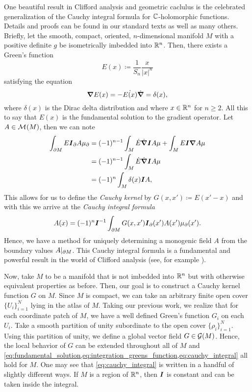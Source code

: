 One beautiful result in Clifford analysis and geometric caclulus is the celebrated generalization of the Cauchy integral formula for $\mathbb{C}$-holomorphic functions. Details and proofs can be found in our standard texts \cite{doran_geometric_2003,hestenes_clifford_1984} as well as many others. Briefly, let the smooth, compact, oriented, $n$-dimensional manifold $M$ with a positive definite $g$ be isometrically imbedded into $\mathbb{R}^n$. Then, there exists a Green's function
\begin{equation}
\label{eq:greens_function}
E(x)\coloneqq \frac{1}{S_n} \frac{x}{|x|^n}
\end{equation}
satisfying the equation
\begin{equation}
\label{eq:fundamental_solution}
\boldsymbol{\nabla} E(x) = -\dot{E(x)}\dot{\boldsymbol{\nabla}} = \delta(x),
\end{equation}
where $\delta(x)$ is the Dirac delta distribution and where $x\in \mathbb{R}^n$ for $n\geq 2$. All this to say that $E(x)$ is the fundamental solution to the gradient operator. Let $A \in \mathcal{M}^{}(M)$, then we can note
\begin{align}
\label{eq:integration_greens_function}
\int_{\partial M} E \boldsymbol{I}_\partial A \mu_\partial &= (-1)^{n-1} \int_M \dot{E}\dot{\boldsymbol{\nabla}} \boldsymbol{I} A\mu + \int_M E \boldsymbol{I} \boldsymbol{\nabla} A\mu \\
&= (-1)^{n-1}\int_M \dot{E}\dot{\boldsymbol{\nabla}}\boldsymbol{I} A \mu \\
&= (-1)^{n} \int_M \delta(x)\boldsymbol{I} A,
\end{align}
This allows for us to define the \emph{Cauchy kernel} by $G(x,x')\coloneqq E(x'-x)$ and with this we arrive at the \emph{Cauchy integral formula}
\begin{equation}
\label{eq:cauchy_integral}
A(x) = (-1)^{n} \boldsymbol{I}^{-1} \int_{\partial M} G(x,x') \boldsymbol{I}_\partial(x') A(x') \mu_\partial(x').
\end{equation}
Hence, we have a method for uniquely determining a monogenic field $A$ from the boundary values $A\vert_{\partial M}$. This Cauchy integral formula is a fundamental and powerful result in the world of Clifford analysis (see, for example \cite{brackx_metric_2006,calderbank_dirac_1997,brackx_fundamental_2012}). 

Now, take $M$ to be a manifold that is not imbedded into $\mathbb{R}^n$ but with otherwise equivalent properties as before. Then, our goal is to construct a Cauchy kernel function $G$ on $M$. Since $M$ is compact, we can take an arbitrary finite open cover $\{U_i\}_{i=1}^{N}$ lying in the atlas of $M$. Taking our previous work, we realize that for each coordinate patch of $M$, we have a well defined Green's function $G_i$ on each $U_i$. Take a smooth partition of unity subordinate to the open cover $\{\rho_i\}_{i=1}^N$. Using this partition of unity, we define a global vector field $G \in \mathcal{G}(M)$. Hence, the local behavior of $G$ can be extended throughout all of $M$ and \cref{eq:fundamental_solution,eq:integration_greens_function,eq:cauchy_integral} all hold for $M$. One may see that \cref{eq:cauchy_integral} is written in a handful of slightly different ways. If $M$ is a region of $\mathbb{R}^n$, then $\boldsymbol{I}$ is constant and can be taken inside the integral.

